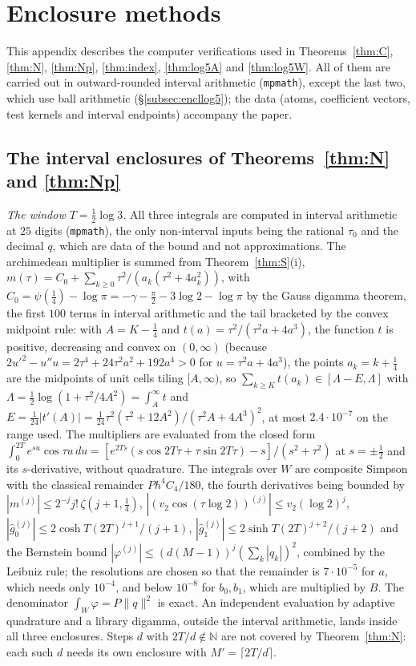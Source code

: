 \documentclass[11pt]{amsart}
\theoremstyle{definition}
\theoremstyle{remark}
\newcommand{\N}{\mathbb N}
\newcommand{\gh}[1]{\widehat g_{#1}}
\begin{document}
\appendix

\section{Enclosure methods}\label{app:encl}

This appendix describes the computer verifications used in Theorems~\ref{thm:C}, \ref{thm:N},
\ref{thm:Np}, \ref{thm:index}, \ref{thm:log5A} and \ref{thm:log5W}. All of them are carried out in
outward-rounded interval arithmetic (\texttt{mpmath}), except the last two, which use ball arithmetic
(\S\ref{subsec:encllog5}); the data (atoms, coefficient vectors, test kernels and interval endpoints)
accompany the paper.

\subsection{The interval enclosures of Theorems~\ref{thm:N} and \ref{thm:Np}}
\emph{The window $T=\frac12\log3$.} All three integrals are computed in interval arithmetic at $25$ digits
(\texttt{mpmath}), the only non-interval inputs being the rational $\tau_0$ and the decimal $q$, which
are data of the bound and not approximations. The archimedean multiplier is summed from
Theorem~\ref{thm:S}(i), $m(\tau)=C_0+\sum_{k\ge0}\tau^2/(a_k(\tau^2+4a_k^2))$, with
$C_0=\psi(\frac14)-\log\pi=-\gamma-\frac\pi2-3\log2-\log\pi$ by the Gauss digamma theorem, the first
$100$ terms in interval arithmetic and the tail bracketed by the convex midpoint rule: with $A=K-\frac14$
and $t(a)=\tau^2/(\tau^2a+4a^3)$, the function $t$ is positive, decreasing and convex on $(0,\infty)$
(because $2u'^2-u''u=2\tau^4+24\tau^2a^2+192a^4>0$ for $u=\tau^2a+4a^3$), the points $a_k=k+\frac14$
are the midpoints of unit cells tiling $[A,\infty)$, so
$\sum_{k\ge K}t(a_k)\in[\Lambda-E,\Lambda]$ with $\Lambda=\frac12\log(1+\tau^2/4A^2)=\int_A^\infty t$
and $E=\frac1{24}|t'(A)|=\frac1{24}\tau^2(\tau^2+12A^2)/(\tau^2A+4A^3)^2$, at most $2.4\cdot10^{-7}$
on the range used. The multipliers are evaluated from the closed form
$\int_0^{2T}e^{su}\cos\tau u\,du=[e^{2Ts}(s\cos2T\tau+\tau\sin2T\tau)-s]/(s^2+\tau^2)$ at
$s=\pm\frac12$ and its $s$-derivative, without quadrature. The integrals over $W$ are composite
Simpson with the classical remainder $Ph^4C_4/180$, the fourth derivatives being bounded by
$|m^{(j)}|\le2^{-j}j!\,\zeta(j+1,\frac14)$, $|(v_2\cos(\tau\log2))^{(j)}|\le v_2(\log2)^j$,
$|\gh0^{(j)}|\le2\cosh T(2T)^{j+1}/(j+1)$, $|\gh1^{(j)}|\le2\sinh T(2T)^{j+2}/(j+2)$ and the Bernstein
bound $|\varphi^{(j)}|\le(d(M-1))^j(\sum_k|q_k|)^2$, combined by the Leibniz rule; the resolutions are
chosen so that the remainder is $7\cdot10^{-5}$ for $a$, which needs only $10^{-4}$, and below
$10^{-8}$ for $b_0,b_1$, which are multiplied by $B$. The denominator $\int_W\varphi=P\|q\|^2$ is
exact. An independent evaluation by adaptive quadrature and a library digamma, outside the interval
arithmetic, lands inside all three enclosures. Steps $d$ with $2T/d\notin\N$ are not covered by
Theorem~\ref{thm:N}: each such $d$ needs its own enclosure with $M'=\lceil2T/d\rceil$.
\end{document}
